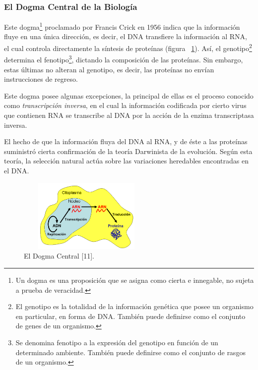 \subsubsection{El Dogma Central de la Biología}
\par Este dogma\footnote{Un dogma es una proposición que se asigna como cierta e innegable, no sujeta a prueba de veracidad.} proclamado por Francis Crick en 1956 indica que la información fluye en una única dirección, es decir, el DNA transfiere la información al RNA, el cual controla directamente la síntesis de proteínas (figura ~\ref{dogma}). Así, el genotipo\footnote{El genotipo es la totalidad de la información genética que posee un organismo en particular, en forma de DNA. También puede definirse como el conjunto de genes de un organismo.} determina el fenotipo\footnote{Se denomina fenotipo a la expresión del genotipo en función de un determinado ambiente. También puede definirse como el conjunto de rasgos de un organismo.}, dictando la composición de las proteínas. Sin embargo, estas últimas no alteran al genotipo, es decir, las proteínas no envían instrucciones de regreso. 
\par Este dogma posee algunas excepciones, la principal de ellas es el proceso conocido como \textit{transcripción inversa}, en el cual la información codificada por cierto virus que contienen RNA se transcribe al DNA por la acción de la enzima transcriptasa inversa. 
\par El hecho de que la información fluya del DNA al RNA, y de éste a las proteínas suministró cierta confirmación de la teoría Darwinista de la evolución\cite{curtis}. Según esta teoría, la selección natural actúa sobre las variaciones heredables encontradas en el DNA\cite{curtis}.



\begin{figure} [h]
	\hspace*{3cm}\includegraphics[width=2.6209in,height=1.4000in]{image/rel.png} %
	\caption{El Dogma Central [11].}	
	\label{dogma}
\end{figure}				

